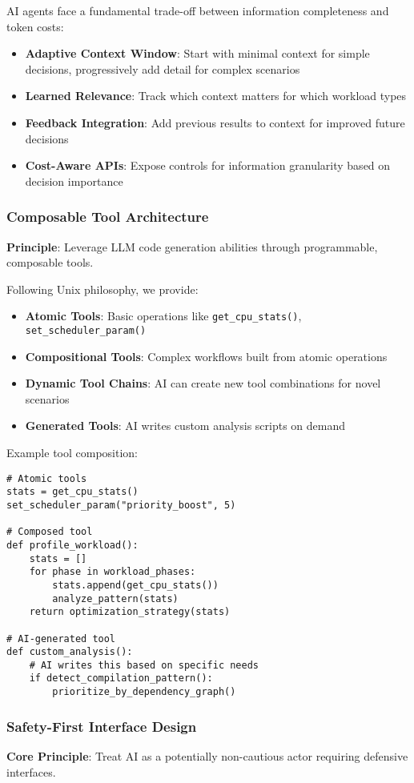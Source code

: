 AI agents face a fundamental trade-off between information completeness and token costs:
\begin{itemize}
\item \textbf{Adaptive Context Window}: Start with minimal context for simple decisions, progressively add detail for complex scenarios
\item \textbf{Learned Relevance}: Track which context matters for which workload types
\item \textbf{Feedback Integration}: Add previous results to context for improved future decisions
\item \textbf{Cost-Aware APIs}: Expose controls for information granularity based on decision importance
\end{itemize}

\subsubsection{Composable Tool Architecture}
\textbf{Principle}: Leverage LLM code generation abilities through programmable, composable tools.

Following Unix philosophy, we provide:
\begin{itemize}
\item \textbf{Atomic Tools}: Basic operations like \texttt{get\_cpu\_stats()}, \texttt{set\_scheduler\_param()}
\item \textbf{Compositional Tools}: Complex workflows built from atomic operations
\item \textbf{Dynamic Tool Chains}: AI can create new tool combinations for novel scenarios
\item \textbf{Generated Tools}: AI writes custom analysis scripts on demand
\end{itemize}

Example tool composition:
\begin{verbatim}
# Atomic tools
stats = get_cpu_stats()
set_scheduler_param("priority_boost", 5)

# Composed tool
def profile_workload():
    stats = []
    for phase in workload_phases:
        stats.append(get_cpu_stats())
        analyze_pattern(stats)
    return optimization_strategy(stats)

# AI-generated tool
def custom_analysis():
    # AI writes this based on specific needs
    if detect_compilation_pattern():
        prioritize_by_dependency_graph()
\end{verbatim}

\subsubsection{Safety-First Interface Design}
\textbf{Core Principle}: Treat AI as a potentially non-cautious actor requiring defensive interfaces.

